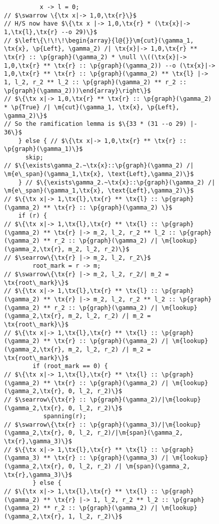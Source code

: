 \documentclass{article}
\newcommand{\tx}[1]{\text{#1}}
\newcommand{\p}[1]{\ensuremath{\mathsf{#1}}} %
\newcommand{\m}[1]{\ensuremath{\mathit{#1}}} %
\begin{document}
\begin{figure}[htbp]
\begin{lstlisting}
          x -> l = 0;
// $\swarrow \{\tx x|-> 1,0,\tx{r}\}$
// H/S now have $\{\tx x |-> 1,0,\tx{r} * (\tx{x}|-> 1,\tx{l},\tx{r} --o 29)\}$
// $\left\{\!\!\!\begin{array}{l@{}}\m{cut}(\gamma_1, \tx{x}, \p{Left}, \gamma_2) /| \tx{x}|-> 1,0,\tx{r} ** \tx{r} :: \p{graph}(\gamma_2) * \null \\((\tx{x}|-> 1,0,\tx{r} ** \tx{r} :: \p{graph}(\gamma_2)) --o (\tx{x}|-> 1,0,\tx{r} ** \tx{r} :: \p{graph}(\gamma_2) ** \tx{l} |-> 1, l_2, r_2 ** l_2 :: \p{graph}(\gamma_2) ** r_2 :: \p{graph}(\gamma_2)))\end{array}\right\}$
// $\{\tx x|-> 1,0,\tx{r} ** \tx{r} :: \p{graph}(\gamma_2) * \p{True} /| \m{cut}(\gamma_1, \tx{x}, \p{Left}, \gamma_2)\}$
// So the ramification lemma is $\{33 * (31 --o 29) |- 36\}$
    } else { // $\{\tx x|-> 1,0,\tx{r} ** \tx{r} :: \p{graph}(\gamma_1)\}$
      skip;
// $\{\exists\gamma_2.~\tx{x}::\p{graph}(\gamma_2) /| \m{e\_span}(\gamma_1,\tx{x}, \text{Left},\gamma_2)\}$
    } // $\{\exists\gamma_2.~\tx{x}::\p{graph}(\gamma_2) /| \m{e\_span}(\gamma_1,\tx{x}, \text{Left},\gamma_2)\}$
// $\{\tx x|-> 1,\tx{l},\tx{r} ** \tx{l} :: \p{graph}(\gamma_2) ** \tx{r} :: \p{graph}(\gamma_2) \}$
    if (r) {
// $\{\tx x|-> 1,\tx{l},\tx{r} ** \tx{l} :: \p{graph}(\gamma_2) ** \tx{r} |-> m_2, l_2, r_2 ** l_2 :: \p{graph}(\gamma_2) ** r_2 :: \p{graph}(\gamma_2) /| \m{lookup}(\gamma_2,\tx{r}, m_2, l_2, r_2)\}$
// $\searrow\{\tx{r} |-> m_2, l_2, r_2\}$
        root_mark = r -> m;
// $\swarrow\{\tx{r} |-> m_2, l_2, r_2/| m_2 = \tx{root\_mark}\}$
// $\{\tx x|-> 1,\tx{l},\tx{r} ** \tx{l} :: \p{graph}(\gamma_2) ** \tx{r} |-> m_2, l_2, r_2 ** l_2 :: \p{graph}(\gamma_2) ** r_2 :: \p{graph}(\gamma_2) /| \m{lookup}(\gamma_2,\tx{r}, m_2, l_2, r_2) /| m_2 = \tx{root\_mark}\}$
// $\{\tx x|-> 1,\tx{l},\tx{r} ** \tx{l} :: \p{graph}(\gamma_2) ** \tx{r} :: \p{graph}(\gamma_2) /| \m{lookup}(\gamma_2,\tx{r}, m_2, l_2, r_2) /| m_2 = \tx{root\_mark}\}$
        if (root_mark == 0) {
// $\{\tx x|-> 1,\tx{l},\tx{r} ** \tx{l} :: \p{graph}(\gamma_2) ** \tx{r} :: \p{graph}(\gamma_2) /| \m{lookup}(\gamma_2,\tx{r}, 0, l_2, r_2)\}$
// $\searrow\{\tx{r} :: \p{graph}(\gamma_2)/|\m{lookup}(\gamma_2,\tx{r}, 0, l_2, r_2)\}$
           spanning(r);
// $\swarrow\{\tx{r} :: \p{graph}(\gamma_3)/|\m{lookup}(\gamma_2,\tx{r}, 0, l_2, r_2)/|\m{span}(\gamma_2, \tx{r},\gamma_3)\}$
// $\{\tx x|-> 1,\tx{l},\tx{r} ** \tx{l} :: \p{graph}(\gamma_3) ** \tx{r} :: \p{graph}(\gamma_3) /| \m{lookup}(\gamma_2,\tx{r}, 0, l_2, r_2) /| \m{span}(\gamma_2, \tx{r},\gamma_3)\}$
        } else {
// $\{\tx x|-> 1,\tx{l},\tx{r} ** \tx{l} :: \p{graph}(\gamma_2) ** \tx{r} |-> 1, l_2, r_2 ** l_2 :: \p{graph}(\gamma_2) ** r_2 :: \p{graph}(\gamma_2) /| \m{lookup}(\gamma_2,\tx{r}, 1, l_2, r_2)\}$

\end{lstlisting}
\end{figure}
\end{document}
